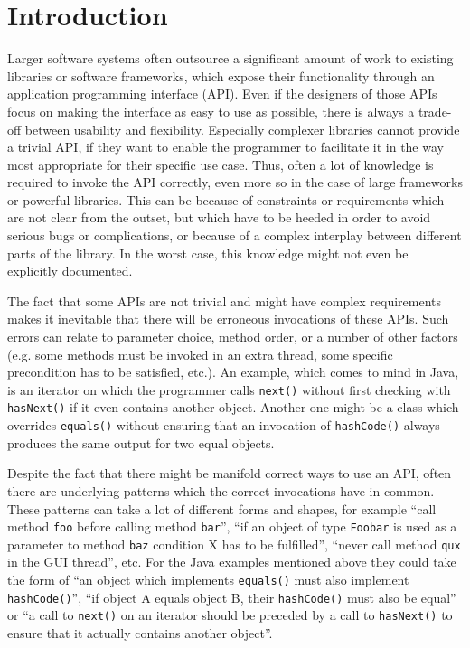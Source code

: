 \chapter{Introduction}\label{chapter:introduction}

Larger software systems often outsource a significant amount of work to existing libraries or software frameworks, which expose their functionality through an application programming interface (API).
Even if the designers of those APIs focus on making the interface as easy to use as possible, there is always a trade-off between usability and flexibility.
Especially complexer libraries cannot provide a trivial API, if they want to enable the programmer to facilitate it in the way most appropriate for their specific use case.
Thus, often a lot of knowledge is required to invoke the API correctly, even more so in the case of large frameworks or powerful libraries.
This can be because of constraints or requirements which are not clear from the outset, but which have to be heeded in order to avoid serious bugs or complications, or because of a complex interplay between different parts of the library.
In the worst case, this knowledge might not even be explicitly documented.

The fact that some APIs are not trivial and might have complex requirements makes it inevitable that there will be erroneous invocations of these APIs.
Such errors can relate to parameter choice, method order, or a number of other factors (e.g. some methods must be invoked in an extra thread, some specific precondition has to be satisfied, etc.).
An example, which comes to mind in Java, is an iterator on which the programmer calls \texttt{next()} without first checking with \texttt{hasNext()} if it even contains another object.
Another one might be a class which overrides \texttt{equals()} without ensuring that an invocation of \texttt{hashCode()} always produces the same output for two equal objects.

Despite the fact that there might be manifold correct ways to use an API, often there are underlying patterns which the correct invocations have in common.
These patterns can take a lot of different forms and shapes, for example ``call method \texttt{foo} before calling method \texttt{bar}'', ``if an object of type \texttt{Foobar} is used as a parameter to method \texttt{baz} condition X has to be fulfilled'', ``never call method \texttt{qux} in the GUI thread'', etc.
For the Java examples mentioned above they could take the form of ``an object which implements \texttt{equals()} must also implement \texttt{hashCode()}'', ``if object A equals object B, their \texttt{hashCode()} must also be equal'' or ``a call to \texttt{next()} on an iterator should be preceded by a call to \texttt{hasNext()} to ensure that it actually contains another object''.


